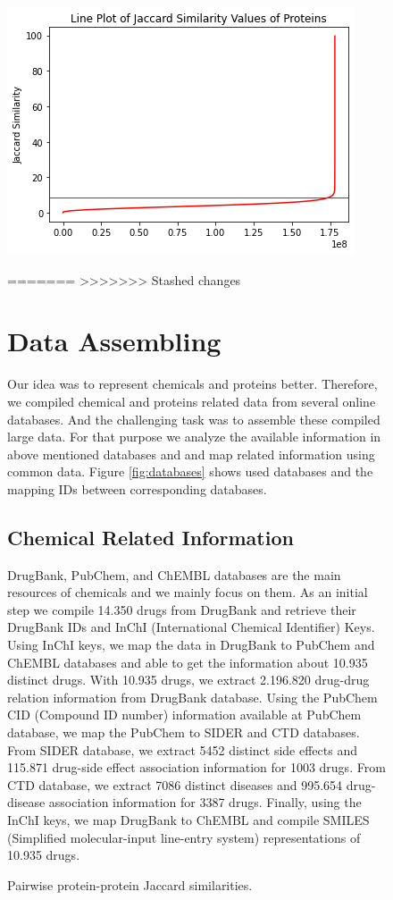 \begin{figure}[h]
    \centering
        \includegraphics[width=0.5\linewidth]{chapters/materials_and_methods/figures/pps_line.png}
    \caption{Pairwise protein-protein Jaccard similarities.}
=======
>>>>>>> Stashed changes

\section{Data Assembling}
\label{section:data_assembling}
Our idea was to represent chemicals and proteins better. Therefore, we compiled chemical and proteins related data from several online databases. And the challenging task was to assemble these compiled large data. For that purpose we analyze the available information in above mentioned databases and and map related information using common data. Figure \ref{fig:databases} shows used databases and the mapping IDs between corresponding databases.

\subsection{Chemical Related Information}
DrugBank, PubChem, and ChEMBL databases are the main resources of chemicals and we mainly focus on them. As an initial step we compile 14.350 drugs from DrugBank and retrieve their DrugBank IDs and InChI (International Chemical Identifier) Keys. Using InChI keys, we map the data in DrugBank to PubChem and ChEMBL databases and able to get the information about 10.935 distinct drugs. With 10.935 drugs, we extract 2.196.820 drug-drug relation information from DrugBank database. Using the PubChem CID (Compound ID number) information available at PubChem database, we map the PubChem to SIDER and CTD databases. From SIDER database, we extract 5452 distinct side effects and 115.871 drug-side effect association information for 1003 drugs. From CTD database, we extract 7086 distinct diseases and 995.654 drug-disease association information for 3387 drugs. Finally, using the InChI keys, we map DrugBank to ChEMBL and compile SMILES (Simplified molecular-input line-entry system) representations of 10.935 drugs. 


\end{figure}
